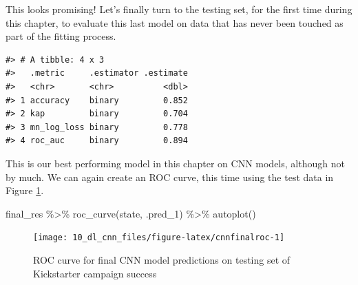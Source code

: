 \documentclass[
]{krantz}
\makeatletter
\newenvironment{Shaded}{\begin{snugshade}}{\end{snugshade}}
\newcommand{\AttributeTok}[1]{\textcolor[rgb]{0.77,0.63,0.00}{#1}}
\newcommand{\FunctionTok}[1]{\textcolor[rgb]{0.00,0.00,0.00}{#1}}
\newcommand{\NormalTok}[1]{#1}
\newcommand{\OtherTok}[1]{\textcolor[rgb]{0.56,0.35,0.01}{#1}}
\newcommand{\SpecialCharTok}[1]{\textcolor[rgb]{0.00,0.00,0.00}{#1}}
\newcommand{\StringTok}[1]{\textcolor[rgb]{0.31,0.60,0.02}{#1}}
\newenvironment{kframe}{%
\medskip{}
\setlength{\fboxsep}{.8em}
 \def\at@end@of@kframe{}%
 \ifinner\ifhmode%
  \def\at@end@of@kframe{\end{minipage}}%
  \begin{minipage}{\columnwidth}%
 \fi\fi%
 \def\FrameCommand##1{\hskip\@totalleftmargin \hskip-\fboxsep
 \colorbox{shadecolor}{##1}\hskip-\fboxsep
     \hskip-\linewidth \hskip-\@totalleftmargin \hskip\columnwidth}%
 \MakeFramed {\advance\hsize-\width
   \@totalleftmargin\z@ \linewidth\hsize
   \@setminipage}}%
 {\par\unskip\endMakeFramed%
 \at@end@of@kframe}
\renewenvironment{Shaded}{\begin{kframe}}{\end{kframe}}
\makeatother
\begin{document}
This looks promising! Let's finally turn to the testing set, for the first time during this chapter, to evaluate this last model on data that has never been touched as part of the fitting process.

\begin{Shaded}
\end{Shaded}

\begin{verbatim}
#> # A tibble: 4 x 3
#>   .metric     .estimator .estimate
#>   <chr>       <chr>          <dbl>
#> 1 accuracy    binary         0.852
#> 2 kap         binary         0.704
#> 3 mn_log_loss binary         0.778
#> 4 roc_auc     binary         0.894
\end{verbatim}

This is our best performing model in this chapter on CNN models, although not by much. We can again create an ROC curve, this time using the test data in Figure \ref{fig:cnnfinalroc}.

\begin{Shaded}
\begin{Highlighting}[]
\NormalTok{final\_res }\SpecialCharTok{\%\textgreater{}\%}
  \FunctionTok{roc\_curve}\NormalTok{(state, .pred\_1) }\SpecialCharTok{\%\textgreater{}\%}
  \FunctionTok{autoplot}\NormalTok{()}
\end{Highlighting}
\end{Shaded}

\begin{figure}

{\centering \texttt{[image: 10\_dl\_cnn\_files/figure-latex/cnnfinalroc-1]} 

}

\caption{ROC curve for final CNN model predictions on testing set of Kickstarter campaign success}\label{fig:cnnfinalroc}
\end{figure}
\end{document}
